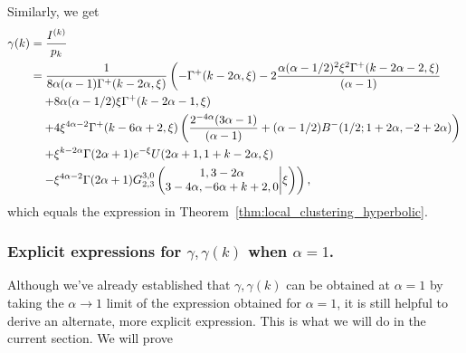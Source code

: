 Similarly, we get
\begin{align*}
	\gamma(k) &= \frac{I^{(k)}}{p_k} \\
	&=\frac{1}{8\alpha (\alpha-1)\Gamma^+(k-2\alpha,\xi)} \left( -\Gamma^+(k - 2 \alpha, \xi) 
		- 2\frac{\alpha (\alpha - 1/2)^2 \xi^{2} \Gamma^+(k - 2 \alpha - 2, \xi)}{(\alpha - 1)} \right. \\ 
	&\hspace{10pt}\left.+ 8 \alpha (\alpha - 1/2) \xi \Gamma^+(k - 2 \alpha - 1,\xi) \right.\\ 
	&\hspace{10pt}\left.+ 4\xi^{4\alpha - 2} \Gamma^+(k - 6 \alpha + 2, 
      \xi) \left( \frac{2^{ - 4\alpha}(3 \alpha - 1)}{(\alpha - 1)} + (\alpha - 1/2) B^-(1/2; 1 + 2 \alpha, -2 + 2 \alpha) \right)  \right.\\ 
	&\hspace{10pt}\left.+ \xi^{k-2\alpha} \Gamma(2\alpha+1)e^{-\xi} U(2\alpha+1,1+k-2\alpha,\xi) \right. \\ 
	&\hspace{10pt}\left.- \xi^{4\alpha-2} \Gamma(2\alpha+1)\MeijerG{3}{0}{2}{3}{1,3-2\alpha}{3-4\alpha,-6\alpha+k+2,0}{\xi}  \right),
\end{align*}
which equals the expression in Theorem~\ref{thm:local_clustering_hyperbolic}. %




\subsubsection{Explicit expressions for $\gamma, \gamma(k)$ when $\alpha=1$.}\label{ssec:alphais1}




Although we've already established that $\gamma, \gamma(k)$ can be obtained at $\alpha=1$ by
taking the $\alpha\to 1$ limit of the expression obtained for $\alpha=1$, it is still helpful
to derive an alternate, more explicit expression.
This is what we will do in the current section.
We will prove 

